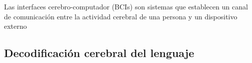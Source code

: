 \documentclass[11pt,spanish,listoffigures,listoftables]{tfgetsinf}
\begin{document}
Las interfaces cerebro-computador (BCIs) son sistemas que establecen un canal de comunicación entre la actividad cerebral de una persona y un dispositivo externo 




\subsection{Decodificación cerebral del lenguaje}
\end{document}
